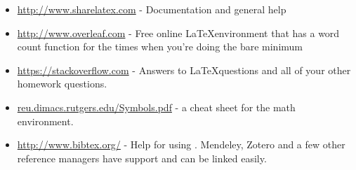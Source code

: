 \begin{itemize}
	\item \url{http://www.sharelatex.com} - Documentation and general help
    \item \url{http://www.overleaf.com} - Free online \LaTeX environment that has a word count function for the times when you're doing the bare minimum 
    \item \url{https://stackoverflow.com} - Answers to \LaTeX questions and all of your other homework questions. 
    \item \url{reu.dimacs.rutgers.edu/Symbols.pdf} - a cheat sheet for the math environment.
    \item \url{http://www.bibtex.org/} - Help for using \BibTeX. Mendeley, Zotero and a few other reference managers have \BibTeX support and can be linked easily. 
\end{itemize}


\endinput